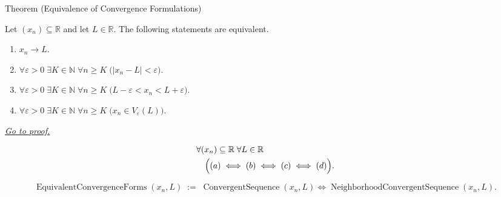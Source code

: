 \begin{theorembox}{Theorem (Equivalence of Convergence Formulations)}
\begin{theorem}
\label{thm:equivalence-of-convergence-formulations}

Let $(x_n) \subseteq \mathbb{R}$ and let $L \in \mathbb{R}$. The following
statements are equivalent.
\begin{enumerate}[label=\textup{(\alph*)}]
    \item $x_n \to L$.
    \item $\forall \varepsilon > 0 \;\exists K \in \mathbb{N} \;\forall n \ge K
          \;\bigl(|x_n - L| < \varepsilon\bigr)$.
    \item $\forall \varepsilon > 0 \;\exists K \in \mathbb{N} \;\forall n \ge K
          \;\bigl(L - \varepsilon < x_n < L + \varepsilon\bigr)$.
    \item $\forall \varepsilon > 0 \;\exists K \in \mathbb{N} \;\forall n \ge K
          \;\bigl(x_n \in V_\varepsilon(L)\bigr)$.
\end{enumerate}

\smallskip
\noindent
\hyperref[prf:equivalence-of-convergence-formulations]{\textit{Go to proof.}}
\end{theorem}
\end{theorembox}

\begin{remark*}
\[
\begin{aligned}
&\forall (x_n) \subseteq \mathbb{R} \;\forall L \in \mathbb{R}\\
&\quad\Bigl(
    (a) \;\Longleftrightarrow\; (b)
         \;\Longleftrightarrow\; (c)
         \;\Longleftrightarrow\; (d)
\Bigr).
\end{aligned}
\]
\end{remark*}

\begin{remark*}
\[
\operatorname{EquivalentConvergenceForms}(x_n,L)
\;:=\;
\operatorname{ConvergentSequence}(x_n,L)
\Longleftrightarrow
\operatorname{NeighborhoodConvergentSequence}(x_n,L).
\]
\end{remark*}

